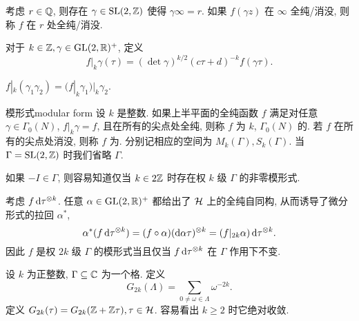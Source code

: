 考虑 $r\in {\mathbb{Q}}$, 则存在 $\gamma\in {\mathrm{SL}}(2,{\mathbb{Z}})$ 使得 $\gamma\infty=r$. 如果 $f(\gamma z)$ 在 $\infty$ 全纯/消没, 则称 $f$ 在 $r$ 处全纯/消没.

对于 $k\in{\mathbb{Z}},\gamma\in{\mathrm{GL}}(2,{\mathbb{R}})^+$, 定义
  \[f|_k\gamma(\tau)=(\det \gamma)^{k/2}(c\tau+d)^{-k}f(\gamma \tau).\]
\begin{proposition}{}{}
$f|_k (\gamma_1\gamma_2)=(f|_k\gamma_1)|_k\gamma_2$.
\end{proposition}

\begin{definition}{模形式}{modular form}
设 $k$ 是整数. 如果上半平面的全纯函数 $f$ 满足对任意 $\gamma\in\Gamma_0(N)$, $f|_k\gamma=f$, 且在所有的尖点处全纯, 则称 $f$ 为 $k$,  $\Gamma_0(N)$ 的. 若 $f$ 在所有的尖点处消没, 则称 $f$ 为. 分别记相应的空间为 $M_k(\Gamma),S_k(\Gamma)$. 当 $\Gamma={\mathrm{SL}}(2,{\mathbb{Z}})$ 时我们省略 $\Gamma$.
\end{definition}

如果 $-I\in\Gamma$, 则容易知道仅当 $k\in 2{\mathbb{Z}}$ 时存在权 $k$ 级 $\Gamma$ 的非零模形式.

考虑 $f\mathop{}\!\mathrm{d} \tau^{\otimes k}$. 任意 $\alpha\in {\mathrm{GL}}(2,{\mathbb{R}})^+$ 都给出了 ${\mathcal{H}}$ 上的全纯自同构, 从而诱导了微分形式的拉回 $\alpha^*$,
  \[\alpha^*(f\mathop{}\!\mathrm{d} \tau^{\otimes k})=(f\circ \alpha)(\mathop{}\!\mathrm{d} \alpha \tau)^{\otimes k}=(f|_{2k} \alpha)\mathop{}\!\mathrm{d} \tau^{\otimes k}.\]
因此 $f$ 是权 $2k$ 级 $\Gamma$ 的模形式当且仅当 $f\mathop{}\!\mathrm{d} \tau^{\otimes k}$ 在 $\Gamma$ 作用下不变.

\begin{example}
设 $k$ 为正整数, $\Gamma\subseteq {\mathbb{C}}$ 为一个格. 定义
  \[G_{2k}(\Lambda)=\sum_{0\neq \omega\in\Lambda}\omega^{-2k}.\]
定义 $G_{2k}(\tau)=G_{2k}({\mathbb{Z}}+{\mathbb{Z}}\tau),\tau\in{\mathcal{H}}$. 容易看出 $k\ge 2$ 时它绝对收敛.
\end{example}

